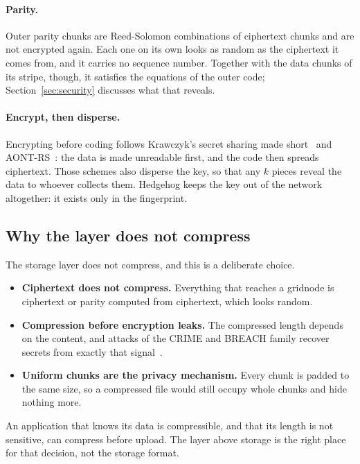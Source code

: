 \documentclass[10pt,a4paper,final]{article}
\begin{document}
\paragraph{Parity.} Outer parity chunks are Reed-Solomon combinations of ciphertext chunks and are not encrypted
again. Each one on its own looks as random as the ciphertext it comes from, and it carries no sequence number.
Together with the data chunks of its stripe, though, it satisfies the equations of the outer code;
Section~\ref{sec:security} discusses what that reveals.

\paragraph{Encrypt, then disperse.} Encrypting before coding follows Krawczyk's secret sharing made
short~\cite{krawczyk1993} and AONT-RS~\cite{resch2011}: the data is made unreadable first, and the code then spreads
ciphertext. Those schemes also disperse the key, so that any $k$ pieces reveal the data to whoever collects them.
Hedgehog keeps the key out of the network altogether: it exists only in the fingerprint.

\subsection{Why the layer does not compress}

The storage layer does not compress, and this is a deliberate choice.

\begin{itemize}
	\item \textbf{Ciphertext does not compress.} Everything that reaches a gridnode is ciphertext or parity computed
	      from ciphertext, which looks random.
	\item \textbf{Compression before encryption leaks.} The compressed length depends on the content, and attacks
	      of the CRIME and BREACH family recover secrets from exactly that
	      signal~\cite{kelsey2002,rizzo2012,gluck2013}.
	\item \textbf{Uniform chunks are the privacy mechanism.} Every chunk is padded to the same size, so a compressed
	      file would still occupy whole chunks and hide nothing more.
\end{itemize}

An application that knows its data is compressible, and that its length is not sensitive, can compress before
upload. The layer above storage is the right place for that decision, not the storage format.
\end{document}
